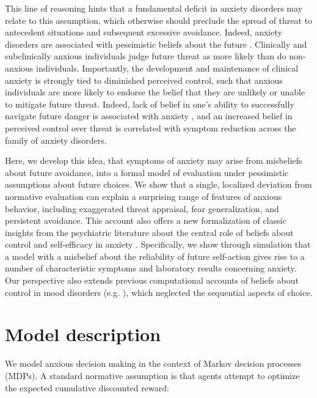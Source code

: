 \documentclass[11pt]{article} %
\begin{document}
This line of reasoning hints that a fundamental deficit in anxiety disorders may relate to this assumption, which otherwise should preclude the spread of threat to antecedent situations and subsequent excessive avoidance. Indeed, anxiety disorders are associated with pessimistic beliefs about the future \citep{ClarkBeck2011}. Clinically and subclinically anxious individuals judge future threat as more likely than do non-anxious individuals\citep{ButlerMathews1983, ButlerMathews1987, MacleodByrne1996}. Importantly, the development and maintenance of clinical anxiety is strongly tied to diminished perceived control\citep{bandura1977, barlow2002, gallagher2014a}, such that anxious individuals are more likely to endorse the belief that they are unlikely or unable to mitigate future threat. Indeed, lack of belief in one's ability to successfully navigate future danger is associated with anxiety \citep{davey1996, dugas1997}, and an increased belief in perceived control over threat is correlated with symptom reduction across the family of anxiety disorders\citep{gallagher2014b}. 

Here, we develop this idea, that symptoms of anxiety may arise from misbeliefs about future avoidance, into a formal model of evaluation under pessimistic assumptions about future choices. We show that a single, localized deviation from normative evaluation can explain a surprising range of features of anxious behavior, including exaggerated threat appraisal, fear generalization, and persistent avoidance. This account also offers a new formalization of classic insights from the psychiatric literature about the central role of beliefs about control and self-efficacy in anxiety \citep{bandura1977, barlow2002}. Specifically, we show through simulation that a model with a misbelief about the reliability of future self-action gives rise to a number of characteristic symptoms and laboratory results concerning anxiety. Our perspective also extends previous computational accounts of beliefs about control in mood disorders (e.g. \cite{HuysDayan2009}), which neglected the sequential aspects of choice.

\section{Model description}

We model anxious decision making in the context of Markov decision processes (MDPs). A standard normative assumption is that agents attempt to optimize the expected cumulative discounted reward:
\end{document}
